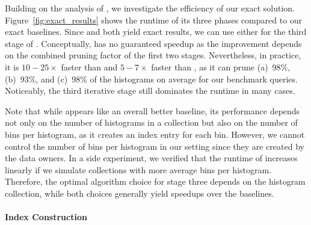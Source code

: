 Building on the analysis of \approximate{}, we investigate the efficiency of our exact solution.
Figure~\ref{fig:exact_results} shows the runtime of its three phases compared to our exact baselines.
Since \pscan and \binsort both yield exact results, we can use either for the third stage of \exact{}.
Conceptually, \exact{} has no guaranteed speedup as the improvement depends on the combined pruning factor of the first two stages.
Nevertheless, in practice, it is $10-25\times$ faster than \pscan and $5-7\times$ faster than \binsort, as it can prune (a)~98\%, (b)~93\%, and (c)~98\% of the histograms on average for our benchmark queries.
Noticeably, the third iterative stage still dominates the runtime in many cases.

Note that while \binsort appears like an overall better baseline, its performance depends not only on the number of histograms in a collection but also on the number of bins per histogram, as it creates an index entry for each bin.
However, we cannot control the number of bins per histogram in our setting since they are created by the data owners.
In a side experiment, we verified that the runtime of \binsort increases linearly if we simulate collections with more average bins per histogram.
Therefore, the optimal algorithm choice for stage three depends on the histogram collection, while both choices generally yield speedups over the baselines.

\paragraph{Index Construction}

